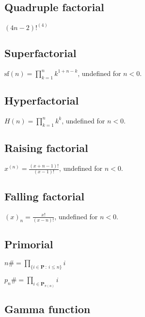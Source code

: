 \subsection{Quadruple factorial}
\label{sec:Quadruple factorial}

\( \displaystyle{
    (4n - 2)!^{(4)}
}\)


\subsection{Superfactorial}
\label{sec:Superfactorial}

\( \displaystyle{
    \mbox{sf}(n) = \prod_{k = 1}^n k^{1 + n - k}
}\), undefined for $n < 0$.


\subsection{Hyperfactorial}
\label{sec:Hyperfactorial}

\( \displaystyle{
    H(n) = \prod_{k = 1}^n k^k
}\), undefined for $n < 0$.


\subsection{Raising factorial}
\label{sec:Raising factorial}

\( \displaystyle{
    x^{(n)} = \frac{(x + n - 1)!}{(x - 1)!}
}\), undefined for $n < 0$.


\subsection{Falling factorial}
\label{sec:Falling factorial}

\( \displaystyle{
    (x)_n = \frac{x!}{(x - n)!}
}\), undefined for $n < 0$.


\subsection{Primorial}
\label{sec:Primorial}

\( \displaystyle{
    n\# = \prod_{\lbrace i \in \textbf{P} ~:~ i \le n \rbrace} i
}\)
\vspace{1em}

\noindent
\( \displaystyle{
    p_n\# = \prod_{i \in \textbf{P}_{\pi(n)}} i
}\)


\subsection{Gamma function}
\label{sec:Gamma function}

